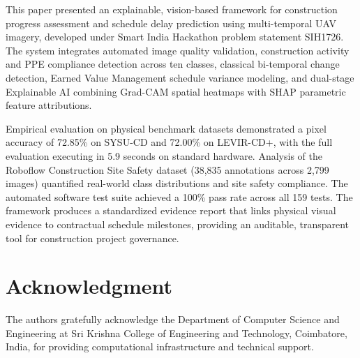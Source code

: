 \documentclass[conference]{IEEEtran}
\begin{document}
This paper presented an explainable, vision-based framework for construction progress assessment and schedule delay prediction using multi-temporal UAV imagery, developed under Smart India Hackathon problem statement SIH1726. The system integrates automated image quality validation, construction activity and PPE compliance detection across ten classes, classical bi-temporal change detection, Earned Value Management schedule variance modeling, and dual-stage Explainable AI combining Grad-CAM spatial heatmaps with SHAP parametric feature attributions.

Empirical evaluation on physical benchmark datasets demonstrated a pixel accuracy of 72.85\% on SYSU-CD and 72.00\% on LEVIR-CD+, with the full evaluation executing in 5.9 seconds on standard hardware. Analysis of the Roboflow Construction Site Safety dataset (38,835 annotations across 2,799 images) quantified real-world class distributions and site safety compliance. The automated software test suite achieved a 100\% pass rate across all 159 tests. The framework produces a standardized evidence report that links physical visual evidence to contractual schedule milestones, providing an auditable, transparent tool for construction project governance.



\section*{Acknowledgment}
The authors gratefully acknowledge the Department of Computer Science and Engineering at Sri Krishna College of Engineering and Technology, Coimbatore, India, for providing computational infrastructure and technical support.



\end{document}
